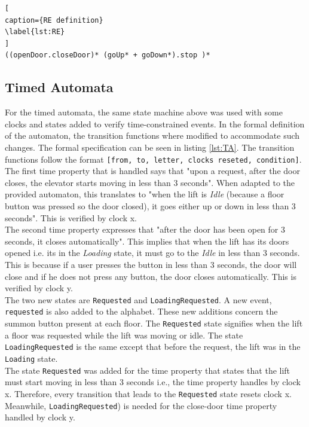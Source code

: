 \documentclass[a4paper, 12pt]{article}
\begin{document}
\begin{lstlisting}[
caption={RE definition}
\label{lst:RE}
]
((openDoor.closeDoor)* (goUp* + goDown*).stop )*

\end{lstlisting}


\subsection{Timed Automata}
\label{sec:timed-automata}
For the timed automata, the same state machine above was used with some clocks and states added to verify time-constrained events. In the formal definition of the automaton, the transition functions where modified to accommodate such changes. The formal specification can be seen in listing \ref{lst:TA}. The transition functions follow the format \texttt{[from, to, letter, clocks reseted, condition]}. \\

The first time property that is handled says that "upon a request, after the door closes, the elevator starts moving in less than 3 seconds". When adapted to the provided automaton, this translates to "when the lift is \textit{Idle} (because a floor button was pressed so the door closed), it goes either up or down in less than 3 seconds". This is verified by clock x. \\

The second time property expresses that "after the door has been open for 3 seconds, it closes automatically". This implies that when the lift has its doors opened i.e. its in the \textit{Loading} state, it must go to the \textit{Idle} in less than 3 seconds. This is because if a user presses the button in less than 3 seconds, the door will close and if he does not press any button, the door closes automatically. This is verified by clock y.  \\

The two new states are \texttt{Requested} and \texttt{LoadingRequested}. A new event, \texttt{requested} is also added to the alphabet. These new additions concern the summon button present at each floor. The \texttt{Requested} state signifies when the lift a floor was requested while the lift was moving or idle. The state \texttt{LoadingRequested} is the same except that before the request, the lift was in the \texttt{Loading} state. \\

The state \texttt{Requested} was added for the time property that states that the lift must start moving in less than 3 seconds i.e., the time property handles by clock x. Therefore, every transition that leads to the \texttt{Requested} state resets clock x. Meanwhile, \texttt{LoadingRequested}) is needed for the close-door time property handled by clock y. 
\end{document}
